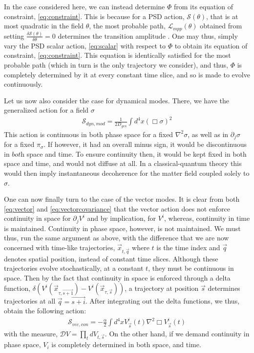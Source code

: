 \documentclass[aps,preprintnumbers,superscriptaddress,longbibliography]{revtex4-1}
\begin{document}
In the case considered here, we can instead determine $\Phi$  from its equation of constraint, \eqref{eq:constraint}. This is because for a PSD action, $\mathcal{S}(\theta)$, that is at most quadratic in the field $\theta$, the most probable path, $\mathcal{L}_{mpp} (\theta)$ obtained from setting  $\frac{\delta\mathcal{S}(\theta)}{\delta\theta}=0$ determines the transition amplitude \cite{Chaichian2018PathI}.  One may thus, simply vary the PSD scalar action, \eqref{eq:scalar} with respect to $\Phi$ to obtain its equation of constraint, \eqref{eq:constraint}. This equation is identically satisfied for the most probable path (which in turn is the only trajectory we consider), and thus, $\Phi$ is completely determined by it at every constant time slice, and so is made to evolve continuously.

Let us now also consider the case for dynamical modes. There, we have the generalized action for a field $\sigma$
\begin{align}
    \mathcal{S}_{dyn,mod}=\frac{1}{2D_{gen}}\int d^4x(\Box\sigma)^2
\end{align}
This action is continuous in both phase space for a fixed $\nabla^2\sigma$, as well as in $\partial_j\sigma$ for a fixed $\pi_{\sigma}$. If however, it had an overall minus sign, it would be discontinuous in $\textit{both}$ space and time. To ensure continuity then, it would be kept fixed in both space and time, and would not diffuse at all.  In a classical-quantum theory this would then imply instantaneous decoherence for the matter field coupled solely to $\sigma$.

One can now finally turn to the case of the vector modes. It is clear from both \eqref{eq:vector} and \eqref{eq:vectorcovariance} that the vector action does not enforce continuity in space for $\partial_jV^i$ and by implication, for $V^i$, whereas, continuity in time is maintained. Continuity in phase space, however, is not maintained. We must thus, run the same argument as above, with the difference that we are now concerned with time-like trajectories, $\vec{x}_{t,\vec{q}}$ where $t$ is the time index and $\vec{q}$ denotes spatial position, instead of constant time slices. Although these trajectories evolve stochastically, at a constant $t$, they must be continuous in space. Then by the fact that continuity in space is enforced through a delta function, $\delta(V^i(\vec{x}_{\tau,{\vec{s+1}}})-V^i(\vec{x}_{\tau,\vec{s}}))$, a trajectory at position $\vec{s}$ determines trajectories at all $\vec{q}=\vec{s+i}$. After integrating out the delta functions, we thus, obtain the following action: 
\begin{align}
    \mathcal{S}_{vec,con}=-\frac{\alpha}{2}\int d^4x V^i_{\vec{s}}(t)\nabla^2\Box V^i_{\vec{s}}(t)
\end{align}
 with the measure, $\mathcal{D} V=\prod_{t} d V_{t,\vec{s}}$. On the other hand, if we demand continuity in phase space, $V_i$ is completely determined in both space, and time. 
\end{document}
